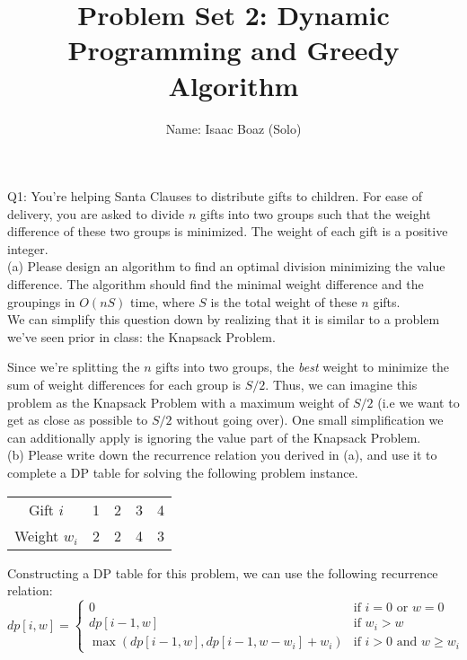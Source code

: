 \documentclass[a4paper,12pt]{article}
\title{Problem Set 2: Dynamic Programming and Greedy Algorithm}
\author{Name: Isaac Boaz (Solo)}
\begin{document}
\maketitle

\noindent Q1: You're helping Santa Clauses to distribute gifts to children. For
ease of delivery, you are asked to divide $n$ gifts into two groups such that
the weight difference of these two groups is minimized. The weight of each gift
is a positive integer. \\[1em]
(a) Please design an algorithm to find an optimal division minimizing the value
difference. The algorithm should find the minimal weight difference and the
groupings in $O(nS)$ time, where $S$ is the total weight of these $n$ gifts.
\\[1em]
We can simplify this question down by realizing that it is similar to a problem
we've seen prior in class: the Knapsack Problem.

Since we're splitting the $n$ gifts into two groups, the \emph{best} weight to
minimize the sum of weight differences for each group is \(S/2\). Thus, we can
imagine this problem as the Knapsack Problem with a maximum weight of \(S/2\)
(i.e we want to get as close as possible to \(S/2\) without going over). One
small simplification we can additionally apply is ignoring the value part of the
Knapsack Problem. \\[1em]
(b) Please write down the recurrence relation you derived in (a), and use it to
complete a DP table for solving the following problem instance.
\begin{center}
  \begin{tabular}{ c | c c c c }
    Gift $i$     & 1 & 2 & 3 & 4 \\
    Weight $w_i$ & 2 & 2 & 4 & 3 \\
  \end{tabular}
\end{center}

Constructing a DP table for this problem, we can use the following recurrence
relation:
\begin{equation*}
  dp[i, w] = \begin{cases}
    0                                            & \text{if } i = 0 \text{ or } w = 0       \\
    dp[i - 1, w]                                 & \text{if } w_i > w                       \\
    \max(dp[i - 1, w], dp[i - 1, w - w_i] + w_i) & \text{if } i > 0 \text{ and } w \geq w_i
  \end{cases}
\end{equation*}
\end{document}
